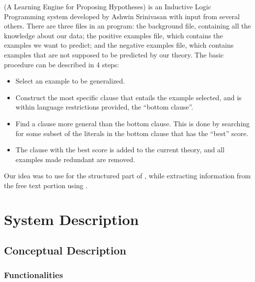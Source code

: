 \documentclass[12pt, openany]{book}
\begin{document}
\alephilp (A Learning Engine for Proposing Hypotheses) is an Inductive Logic Programming system developed by Ashwin Srinivasan with input from several others. There are three files in an \alephilp program: the background file, containing all the knowledge about our data; the positive examples file, which contains the examples we want to predict; and the negative examples file, which contains examples that are not supposed to be predicted by our theory. The basic \alephilp procedure can be described in 4 steps:
\begin{itemize}
	\item Select an example to be generalized.
	\item Construct the most specific clause that entails the example selected, and is within language restrictions provided, the ``bottom clause''.
	\item Find a clause more general than the bottom clause. This is done by searching for some subset of the literals in the bottom clause that has the ``best'' score.
	\item The clause with the best score is added to the current theory, and all examples made redundant are removed. 
\end{itemize}

Our idea was to use \alephilp for the structured part of \drugbank, while extracting information from the free text portion using \wordvec.

\chapter{System Description}
\section{Conceptual Description}
\subsection{Functionalities}
\end{document}
